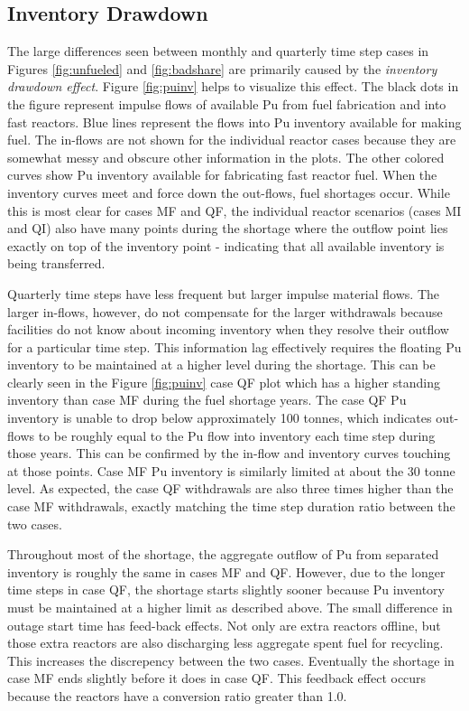 \documentclass{style}
\begin{document}
\subsection{Inventory Drawdown}

The large differences seen between monthly and quarterly time step cases in
Figures \ref{fig:unfueled} and \ref{fig:badshare} are primarily caused by the
\emph{inventory drawdown effect}.  Figure \ref{fig:puinv} helps to visualize
this effect.  The black dots in the figure represent impulse flows of
available Pu from fuel fabrication and into fast reactors.  Blue lines represent
the flows into Pu inventory available for making fuel. The in-flows are not
shown for the individual reactor cases because they are somewhat messy and
obscure other information in the plots. The other colored curves show Pu inventory
available for fabricating fast reactor fuel.  When the inventory curves meet and
force down the out-flows, fuel shortages occur.  While this is most clear for
cases MF and QF, the individual reactor scenarios (cases MI and QI) also have many
points during the shortage where the outflow point lies exactly on top of the
inventory point - indicating that all available inventory is being
transferred.

Quarterly time steps have less frequent but larger impulse material flows.
The larger in-flows, however, do not compensate for the larger withdrawals
because facilities do not know about incoming inventory when they resolve
their outflow for a particular time step.  This information lag effectively
requires the floating Pu inventory to be maintained at a higher level during
the shortage.  This can be clearly seen in the Figure \ref{fig:puinv} case QF plot which has a higher
standing inventory than case MF during the fuel shortage years.  The case QF Pu
inventory is unable to drop below approximately 100 tonnes, which indicates
out-flows to be roughly equal to the Pu flow into inventory each time step
during those years.  This can be confirmed by the in-flow and inventory curves
touching at those points.  Case MF Pu inventory is similarly limited at about
the 30 tonne level.  As expected, the case QF withdrawals are also three times
higher than the case MF withdrawals, exactly matching the time step duration ratio
between the two cases.

Throughout most of the shortage, the aggregate outflow of Pu from separated
inventory is roughly the same in cases MF and QF.  However, due to the longer
time steps in case QF, the shortage starts slightly sooner because Pu inventory
must be maintained at a higher limit as described above.  The small difference
in outage start time has feed-back effects.  Not only are extra reactors
offline, but those extra reactors are also discharging less aggregate spent
fuel for recycling.  This increases the discrepency between the two
cases. Eventually the shortage in case MF ends slightly before it does in case
QF. This feedback effect occurs because the reactors have a
conversion ratio greater than 1.0.
\end{document}
